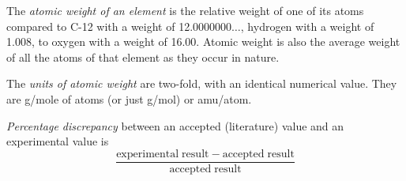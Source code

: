 \documentclass{article}
\begin{document}
\begin{enumerate}
\begin{item}
The \emph{atomic weight of an element} is the relative weight of one of its atoms compared to C-12 with a weight of 12.0000000$\ldots$, hydrogen with a weight of 1.008, to oxygen with a weight of 16.00. Atomic weight is also the average weight of all the atoms of that element as they occur in nature.
\end{item}
\begin{item}
The \emph{units of atomic weight} are two-fold, with an identical numerical value. They are g/mole of atoms (or just g/mol) or amu/atom.
\end{item}
\begin{item}
\emph{Percentage discrepancy} between an accepted (literature) value and an experimental value is
\begin{equation*}
\frac{\mathrm{experimental\;result} - \mathrm{accepted\;result}}{\mathrm{accepted\;result}}
\end{equation*}
\end{item}
\end{enumerate}






\end{document}
